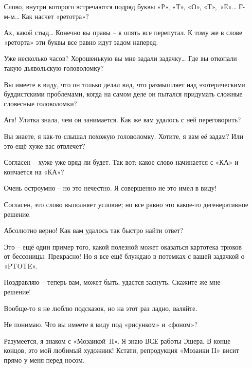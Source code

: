 \documentclass[../main.tex]{subfiles}
\begin{document}
\begin{Dialogue}
 Слово, внутри которого встречаются подряд буквы «Р», «Т», «О», «Т»,~«Е»\ldots{} Г-м-м\ldots{} Как насчет «ретотра»?

 Ах, какой стыд\ldots{} Конечно вы правы \--- я опять все перепутал. К тому же в слове «реторта» эти буквы все равно идут задом наперед.

 Уже несколько часов? Хорошенькую вы мне задали задачку\ldots{} Где вы откопали такую дьявольскую головоломку?

 Вы имеете в виду, что он только делал вид, что размышляет над эзотерическими буддистскими проблемами, когда на самом деле он пытался придумать сложные словесные головоломки?

 Ага! Улитка знала, чем он занимается. Как же вам удалось с ней переговорить?

 Вы знаете, я как-то слышал похожую головоломку. Хотите, я вам её задам? Или это ещё хуже вас отвлечет?

 Согласен \--- хуже уже вряд ли будет. Так вот: какое слово начинается с «КА» и кончается на «КА»?

 Очень остроумно \--- но это нечестно. Я совершенно не это имел в виду!

 Согласен, это слово выполняет условие; но все равно это какое-то дегенеративное решение.

 Абсолютно верно! Как вам удалось так быстро найти ответ?

 Это \--- ещё один пример того, какой полезной может оказаться картотека трюков от бессоницы. Прекрасно! Но я все ещё блуждаю в потемках с вашей задачкой о «PTOTE».

 Поздравляю \--- теперь вам, может быть, удастся заснуть. Скажите же мне решение!

 Вообще-то я не люблю подсказок, но на этот раз ладно, валяйте.

 Не понимаю. Что вы имеете в виду под «рисунком» и «фоном»?


 Разумеется, я знаком с «Мозаикой~II». Я знаю ВСЕ работы Эшера. В конце концов, это мой любимый художник! Кстати, репродукция «Мозаики II» висит прямо у меня перед носом.


\end{Dialogue}
\end{document}
